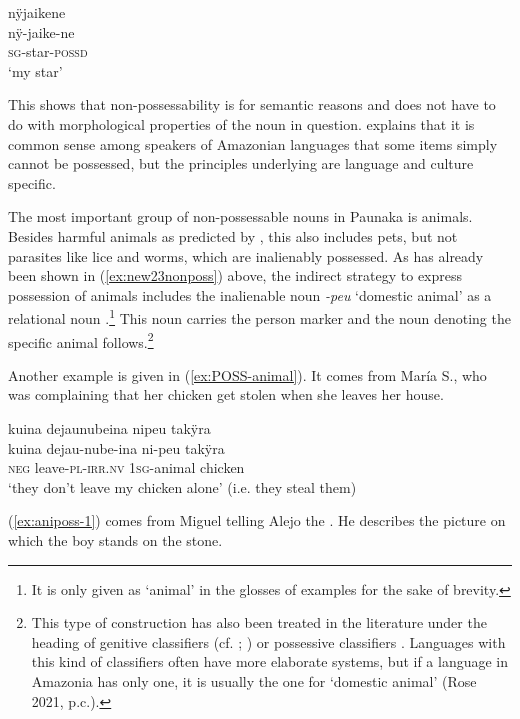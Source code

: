 \ea\label{ex:possessed-star}
\begingl 
\glpreamble nÿjaikene\\
\gla nÿ-jaike-ne\\ 
\textsc{sg}-star-\textsc{possd}\\ 
\glft ‘my star’
\trailingcitation{[mxx-e181017l]}
\xe

This shows that non-possessability is for semantic reasons and does not have to do with morphological properties of the noun in question. \citet[170]{Aikhenvald2012} explains that it is common sense among speakers of Amazonian languages that some items simply cannot be possessed, but the principles underlying are language and culture specific.

The most important group of non-possessable nouns in Paunaka is animals. Besides harmful animals as  predicted by \citet[82]{Aikhenvald1999}, this also includes pets, but not parasites like lice and worms, which are inalienably possessed. As has already been shown in (\ref{ex:new23nonposs}) above, the indirect strategy to express possession of animals includes the inalienable noun \textit{-peu} ‘domestic animal’ as a relational noun .\footnote{It is only given as ‘animal’ in the glosses of examples for the sake of brevity.} This noun carries the person marker and the noun denoting the specific animal follows.\footnote{This type of construction has also been treated in the literature under the heading of genitive classifiers (cf. \citealt[66]{Grinevald2000}; \citealt[283]{Campbell2012}) or possessive classifiers \citep[]{Fabre2014}. Languages with this kind of classifiers often have more elaborate systems, but if a language in Amazonia has only one, it is usually the one for ‘domestic animal’ (Rose 2021, p.c.).} 

Another example is given in (\ref{ex:POSS-animal}). It comes from María S., who was complaining that her chicken get stolen when she leaves her house.

\ea\label{ex:POSS-animal}
\begingl 
\glpreamble kuina dejaunubeina nipeu takÿra\\
\gla kuina dejau-nube-ina ni-peu takÿra\\ 
\glb \textsc{neg} leave-\textsc{pl}-\textsc{irr.nv} 1\textsc{sg}-animal chicken\\ 
\glft ‘they don't leave my chicken alone’ (i.e. they steal them)
\trailingcitation{[rxx-e120511l.179]}
\xe

(\ref{ex:aniposs-1}) comes from Miguel telling Alejo the . He describes the picture on which the boy stands on the stone. 

